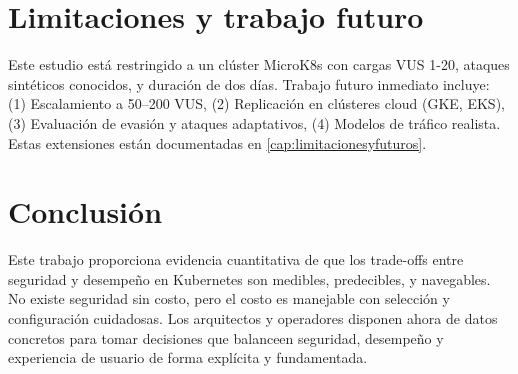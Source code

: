 \section{Limitaciones y trabajo futuro}

Este estudio está restringido a un clúster MicroK8s con cargas VUS 1-20, ataques sintéticos conocidos, y duración de dos días. Trabajo futuro inmediato incluye: (1) Escalamiento a 50--200 VUS, (2) Replicación en clústeres cloud (GKE, EKS), (3) Evaluación de evasión y ataques adaptativos, (4) Modelos de tráfico realista. Estas extensiones están documentadas en \autoref{cap:limitacionesyfuturos}.

\section{Conclusión}

Este trabajo proporciona evidencia cuantitativa de que los trade-offs entre seguridad y desempeño en Kubernetes son medibles, predecibles, y navegables. No existe seguridad sin costo, pero el costo es manejable con selección y configuración cuidadosas. Los arquitectos y operadores disponen ahora de datos concretos para tomar decisiones que balanceen seguridad, desempeño y experiencia de usuario de forma explícita y fundamentada.
